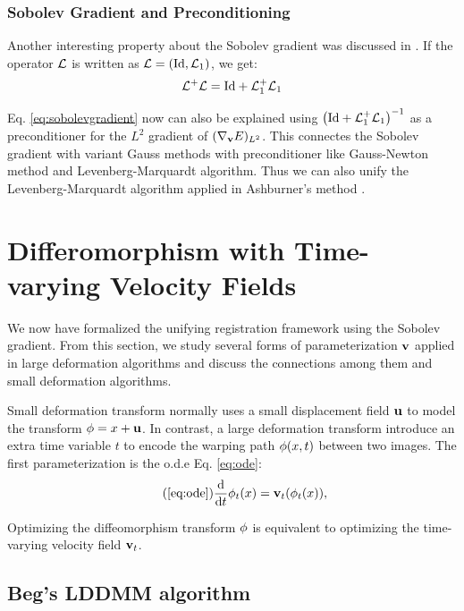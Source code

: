 \documentclass[letterpaper,12pt]{article}
\begin{document}
\subsubsection{Sobolev Gradient and Preconditioning}
\label{sec:sobolevprecondition}

Another interesting property about the Sobolev gradient was discussed in \cite{Zikic2010}. If the operator $\mathcal{L}$ is written as $\mathcal{L} = (\text{Id}, \mathcal{L}_1)$, we get:
\begin{align}
\mathcal{L}^+\mathcal{L} = \text{Id} + \mathcal{L}_1^+ \mathcal{L}_1
\end{align}

Eq. \ref{eq:sobolevgradient} now can also be explained using $\left( \text{Id} + \mathcal{L}_1^+ \mathcal{L}_1 \right)^{-1}$ as a preconditioner for the $L^2$ gradient of $(\nabla_{\mathbf{v}}E)_{L^2}$. This connectes the Sobolev gradient with variant Gauss methods with preconditioner like Gauss-Newton method and Levenberg-Marquardt algorithm. Thus we can also unify the Levenberg-Marquardt algorithm applied in Ashburner's method \cite{Ashburner2007}.


\section{Differomorphism with Time-varying Velocity Fields}
\label{sec:lddmm}

We now have formalized the unifying registration framework using the Sobolev gradient. From this section, we study several forms of parameterization $\mathbf{v}$ applied in large deformation algorithms and discuss the connections among them and small deformation algorithms.

Small deformation transform normally uses a small displacement field $\mathbf{u}$ to model the transform $\phi = x + \mathbf{u}$. In contrast, a large deformation transform introduce an extra time variable $t$ to encode the warping path $\phi(x,t)$ between two images. The first parameterization is the o.d.e Eq. \ref{eq:ode}:
\begin{align}
\tag{\ref{eq:ode}}
\frac{\dd}{\dd t} \myphi_t(x) = \v_t(\myphi_t(x)), 
\end{align}

Optimizing the diffeomorphism transform $\phi$ is equivalent to optimizing the time-varying velocity field $\mathbf{v}_t$. 

\subsection{Beg's LDDMM algorithm}
\end{document}
